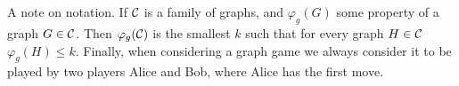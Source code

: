
  
    
A note on notation. If $\mathcal{C}$ is a family of graphs, and $\varphi_g(G)$ some property of a graph $G \in \mathcal{C}$. Then $\varphi_g(\mathcal{C})$ is the smallest $k$ such that for every graph $H\in\mathcal{C}$ $\varphi_g(H)\leq k$. Finally, when considering a graph game we always consider it to be played by two players Alice and Bob, where Alice has the first move.     

    
    
    
    
    
    
    
    
    
    
    
    
    
    
    
    
    
    
    
    
    